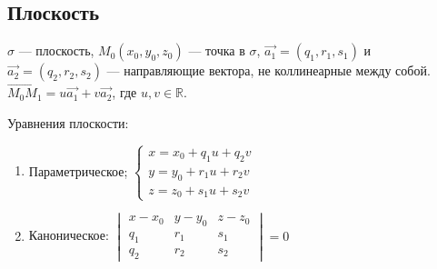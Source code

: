 \documentclass[a4paper]{article}
\begin{document}
    \newpage \begin{center}
                 \begin{Large}
                 \end{Large}
    \end{center}
    \subsection*{Плоскость}

    $\sigma$ --- плоскость, $M_0(x_0, y_0, z_0)$ --- точка в $\sigma$, $\vec{a_1} = (q_1, r_1, s_1)$ и $\vec{a_2} = (q_2, r_2, s_2)$ --- направляющие вектора, не коллинеарные между собой.
    $\overrightarrow{M_0M_1} = u\vec{a_1} + v\vec{a_2}$, где $u, v \in \mathbb{R}$.


    Уравнения плоскости: \begin{enumerate}
                             \item Параметрическое; $
                             \begin{cases}
                                 x = x_0 + q_1u + q_2v
                                 \\
                                 y = y_0 + r_1u + r_2v
                                 \\
                                 z = z_0 + s_1u + s_2v
                             \end{cases}
                             $
                             \item Каноническое: $\begin{vmatrix}
                                                      x-x_0 & y-y_0 & z-z_0 \\
                                                      q_1   & r_1   & s_1   \\
                                                      q_2   & r_2   & s_2
                             \end{vmatrix} = 0$


\end{enumerate}
\end{document}
